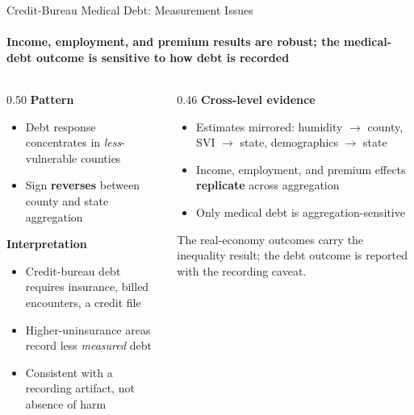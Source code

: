 \documentclass[aspectratio=169,11pt]{beamer}
\newcommand{\emphcolor}[1]{{\color{WarmOrange}\textbf{#1}}}
\newcommand{\tealtext}[1]{{\color{Teal}#1}}
\newcommand{\graytext}[1]{{\color{WarmGray}#1}}
\begin{document}
\begin{frame}{Credit-Bureau Medical Debt: Measurement Issues}
  \framesubtitle{Income, employment, and premium results are robust; the medical-debt outcome is sensitive to how debt is recorded}
  \begin{columns}[T]
    \begin{column}{0.50\textwidth}
      \footnotesize
      \textbf{\tealtext{Pattern}}
      \begin{itemize}\itemsep0.12em
        \item Debt response concentrates in \emph{less}-vulnerable counties
        \item Sign \emphcolor{reverses} between county and state aggregation
      \end{itemize}
      \vspace{0.2em}
      \textbf{\tealtext{Interpretation}}
      \begin{itemize}\itemsep0.12em
        \item Credit-bureau debt requires insurance, billed encounters, a credit file
        \item Higher-uninsurance areas record less \emph{measured} debt
        \item Consistent with a recording artifact, not absence of harm
      \end{itemize}
    \end{column}
    \begin{column}{0.46\textwidth}
      \textbf{\tealtext{Cross-level evidence}}\\[0.2em]
      \footnotesize
      \begin{itemize}\itemsep0.12em
        \item Estimates mirrored: humidity \(\to\) county, SVI \(\to\) state, demographics \(\to\) state
        \item Income, employment, and premium effects \emphcolor{replicate} across aggregation
        \item Only medical debt is aggregation-sensitive
      \end{itemize}
      \vspace{0.3em}
      \graytext{\scriptsize The real-economy outcomes carry the inequality result; the debt outcome is reported with the recording caveat.}
    \end{column}
  \end{columns}
\end{frame}
\end{document}

